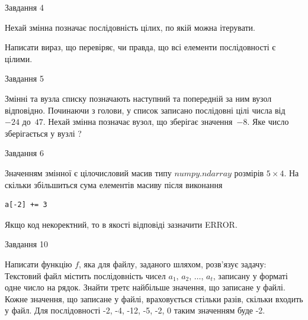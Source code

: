 \documentclass[12pt, ukrainian]{article}
\begin{document}
{\begin{minipage}[t]{8.0cm}
\end{minipage}


               
{\begin{center}Завдання {4}\end{center}}
\vspace{-4mm}
Нехай змінна  позначає послідовність цілих, по якій можна ітерувати.

Написати вираз, що перевіряє, чи правда, що всі елементи послідовності є цілими.\par

\vspace{10mm}
               
{\begin{center}Завдання {5}\end{center}}
\vspace{-4mm}
Змінні  та  вузла списку позначають наступний та попередній за ним вузол відповідно. Починаючи з голови, у список записано послідовні цілі числа від~$-24$ до~$47$. Нехай змінна  позначає вузол, що зберігає значення~$-8$.
Яке число зберігається у вузлі  ?\par

               
{\begin{center}Завдання {6}\end{center}}
\vspace{-4mm}
Значенням змінної  є цілочисловий масив типу $numpy.ndarray$ розмірів $5{\times}4$. На скільки збільшиться сума елементів масиву  після виконання
\begin{verbatim}
a[-2] += 3
\end{verbatim}


Якщо код некоректний, то в якості відповіді зазначити ERROR.\par

               
{\begin{center}Завдання {10}\end{center}}
\vspace{-4mm}

Написати функцію $f$, яка для файлу, заданого шляхом, розв’язує задачу:\\ Текстовий файл містить послідовність чисел $a_1$, $a_2$, $\ldots$, $a_t$, записану у форматі одне число на рядок. Знайти третє найбільше значення, що записане у файлі. Кожне значення, що записане у файлі, враховується стільки разів, скільки входить у файл. Для послідовності -2, -4, -12, -5, -2, 0 таким значенням буде -2.

}
\end{document}
